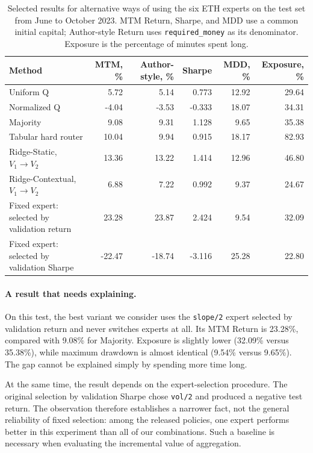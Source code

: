 \documentclass[9pt,a4paper,twocolumn]{extarticle}
\begin{document}
\begin{table}[t]
  \centering
  \caption{Selected results for alternative ways of using the six ETH experts on the test set
  from June to October 2023. MTM Return, Sharpe, and MDD use a common initial capital;
  Author-style Return uses \texttt{required\_money} as its denominator. Exposure is the
  percentage of minutes spent long.}
  \label{tab:aggregation_results}
  \footnotesize
  \renewcommand{\arraystretch}{1.15}
  \begin{tabularx}{\textwidth}{@{}Xrrrrr@{}}
    \toprule
    Method
    & MTM, \%
    & Author-style, \%
    & Sharpe
    & MDD, \%
    & Exposure, \%\\
    \midrule
    Uniform Q
      & 5.72 & 5.14 & 0.773 & 12.92 & 29.64\\
    Normalized Q
      & -4.04 & -3.53 & -0.333 & 18.07 & 34.31\\
    Majority
      & 9.08 & 9.31 & 1.128 & 9.65 & 35.38\\
    Tabular hard router
      & 10.04 & 9.94 & 0.915 & 18.17 & 82.93\\
    Ridge-Static, $V_1\rightarrow V_2$
      & 13.36 & 13.22 & 1.414 & 12.96 & 46.80\\
    Ridge-Contextual, $V_1\rightarrow V_2$
      & 6.88 & 7.22 & 0.992 & 9.37 & 24.67\\
    Fixed expert:
    selected by validation return
      & 23.28 & 23.87 & 2.424 & 9.54 & 32.09\\
    Fixed expert:
    selected by validation Sharpe
      & -22.47 & -18.74 & -3.116 & 25.28 & 22.80\\
    \bottomrule
  \end{tabularx}
\end{table}

\paragraph{A result that needs explaining.}

On this test, the best variant we consider uses the \texttt{slope/2} expert selected by
validation return and never switches experts at all. Its MTM Return is 23.28\%, compared with
9.08\% for Majority. Exposure is slightly lower (32.09\% versus 35.38\%), while maximum drawdown
is almost identical (9.54\% versus 9.65\%). The gap cannot be explained simply by spending more
time long.

At the same time, the result depends on the expert-selection procedure. The original selection
by validation Sharpe chose \texttt{vol/2} and produced a negative test return. The observation
therefore establishes a narrower fact, not the general reliability of fixed selection: among the
released policies, one expert performs better in this experiment than all of our combinations.
Such a baseline is necessary when evaluating the incremental value of aggregation.
\end{document}
